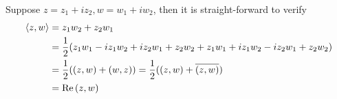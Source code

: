 \begin{exercise}
	Suppose $z = z_1 + iz_2, w = w_1 + iw_2$, then it is straight-forward to verify
	\begin{align*}
		\left\langle z,w \right\rangle &= z_1 w_2 + z_2 w_1 \\
		&= \frac{1}{2}( z_1w_1 - iz_1w_2 + iz_2w_1 + z_2w_2 + z_1w_1 + iz_1w_2 - iz_2w_1 + z_2w_2 ) \\
		&= \frac{1}{2}( (z,w) + (w,z) ) = \frac{1}{2}( (z,w) + \overline{(z,w)} ) \\
		&= \Re\left(z,w\right)
	\end{align*}
\end{exercise}

\begin{exercise}

\end{exercise}

\begin{exercise}

\end{exercise}

\begin{exercise}

\end{exercise}

\begin{exercise}

\end{exercise}

\begin{exercise}

\end{exercise}

\begin{exercise}

\end{exercise}

\begin{exercise}

\end{exercise}

\begin{exercise}

\end{exercise}

\begin{exercise}

\end{exercise}

\begin{exercise}

\end{exercise}

